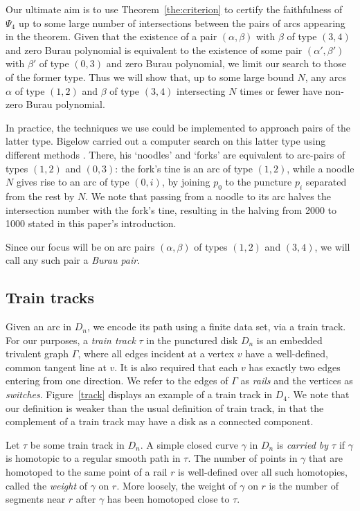 Our ultimate aim is to use Theorem~\ref{the:criterion} to certify the faithfulness of $\Psi_4$ up to some large number of intersections between the pairs of arcs appearing in the theorem. Given that the existence of a pair $(\alpha, \beta)$ with $\beta$ of type $(3,4)$ and zero Burau polynomial is equivalent to the existence of some pair $(\alpha', \beta')$ with $\beta '$ of type $(0,3)$ and zero Burau polynomial, we limit our search to those of the former type. Thus we will show that, up to some large bound $N$, any arcs $\alpha$ of type $(1,2)$ and $\beta$ of type $(3,4)$ intersecting $N$ times or fewer have non-zero Burau polynomial.
 
In practice, the techniques we use could be implemented to approach pairs of the latter type. Bigelow carried out a computer search on this latter type using different methods \cite{Big02}. There, his `noodles' and `forks' are equivalent to arc-pairs of types $(1,2)$ and $(0,3)$: the fork's tine is an arc of type $(1,2)$, while a noodle $N$ gives rise to an arc of type $(0,i)$, by joining $p_0$ to the puncture $p_i$ separated from the rest by $N$. We note that passing from a noodle to its arc halves the intersection number with the fork's tine, resulting in the halving from 2000 to 1000 stated in this paper's introduction.

Since our focus will be on arc pairs $(\alpha, \beta)$ of types $(1,2)$ and $(3,4)$, we will call any such pair a \emph{Burau pair}.
 
\subsection{Train tracks}

Given an arc in $D_n$, we encode its path using a finite data set, via a train track. For our purposes, a \emph{train track} $\tau$ in the punctured disk $D_n$ is an embedded trivalent graph $\Gamma$, where all edges incident at a vertex $v$ have a well-defined, common tangent line at $v$. It is also required that each $v$ has exactly two edges entering from one direction. We refer to the edges of $\Gamma$ as \emph{rails} and the vertices as \emph{switches}. Figure~\ref{track} displays an example of a train track in $D_4$. We note that our definition is weaker than the usual definition of train track, in that the complement of a train track may have a disk as a connected component.

Let $\tau$ be some train track in $D_n$. A simple closed curve $\gamma$ in $D_n$ is \emph{carried by $\tau$} if $\gamma$ is homotopic to a regular smooth path in $\tau$. The number of points in $\gamma$ that are homotoped to the same point of a rail $r$ is well-defined over all such homotopies, called the \emph{weight} of $\gamma$ on $r$. More loosely, the weight of $\gamma$ on $r$ is the number of segments near $r$ after $\gamma$ has been homotoped close to $\tau$.

